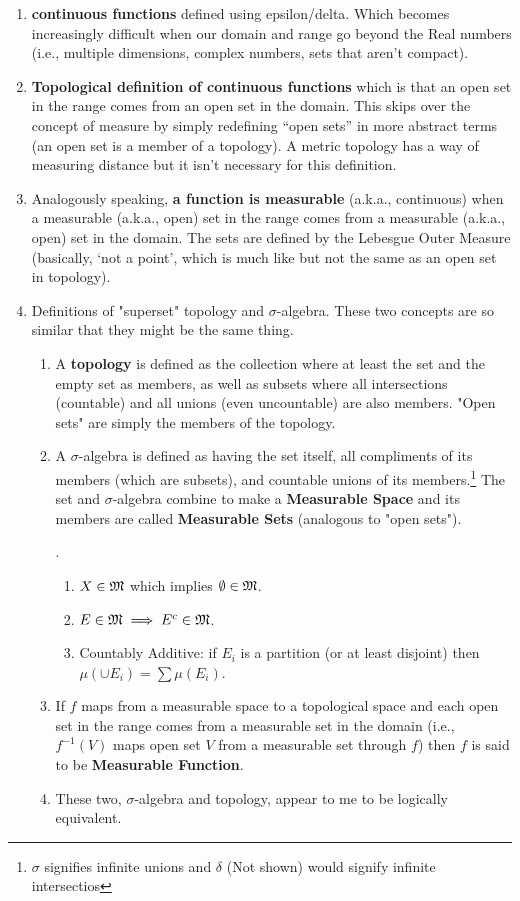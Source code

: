 \documentclass[10pt,a4paper]{report}
\begin{document}
\begin{enumerate}
    \item  \textbf{continuous functions} defined using epsilon/delta.  Which becomes increasingly difficult when our domain and range go beyond the Real numbers (i.e., multiple dimensions, complex numbers, sets that aren’t compact).
    \item  \textbf{Topological definition of continuous functions} which is that an open set in the range comes from an open set in the domain.  This skips over the concept of measure by simply redefining “open sets” in more abstract terms (an open set is a member of a topology).  A metric topology has a way of measuring distance but it isn’t necessary for this definition.
    \item  Analogously speaking, \textbf{a function is measurable} (a.k.a., continuous) when a measurable (a.k.a., open) set in the range comes from a measurable (a.k.a., open) set in the domain.  The sets are defined by the Lebesgue Outer Measure (basically, ‘not a point’, which is much like but not the same as an open set in topology).
    \item Definitions of "superset" topology and $\sigma$-algebra.  These two concepts are so similar that they might be the same thing.
    \begin{enumerate}
    		\item A \textbf{topology} is defined as the collection where at least the set and the empty set as members, as well as subsets where all intersections (countable) and all unions (even uncountable) are also members.  "Open sets" are simply the members of the topology.
    		\item A $\sigma$-algebra is defined as having the set itself, all compliments of its members (which are subsets), and countable unions of its members.\footnote{$\sigma$ signifies infinite unions and $\delta$ (Not shown) would signify infinite intersectios} The set and $\sigma$-algebra combine to make a \textbf{Measurable Space} and its members are called \textbf{Measurable Sets} (analogous to "open sets"). 
    		\begin{definition}.
    		
    		\begin{enumerate}
    			\item $X \in \mathfrak{M}$ which implies $\emptyset \in \mathfrak{M}$.
    			\item $E \in \mathfrak{M} \implies E^c \in \mathfrak{M}$.
    			\item Countably Additive: if $E_i$ is a partition (or at least disjoint) then $\mu(\cup E_i) = \sum \mu(E_i)$. 
    		\end{enumerate}
    		\end{definition}
    		\item If $f$ maps from a measurable space to a topological space and each open set in the range comes from a measurable set in the domain (i.e., $f^{-1}(V)$ maps open set $V$ from a measurable set through $f$) then $f$ is said to be \textbf{Measurable Function}.
    		\item These two, $\sigma$-algebra and topology, appear to me to be logically equivalent.
    		

\end{enumerate}
\end{enumerate}
\end{document}
